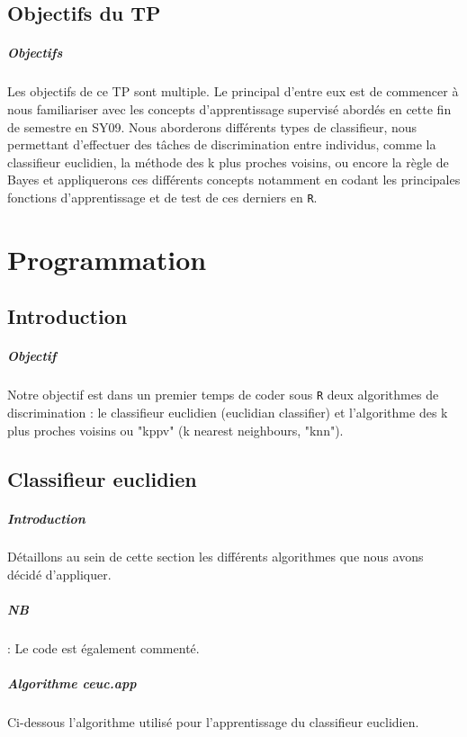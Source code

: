 \documentclass{report}
\begin{document}
\section{Objectifs du TP}
\paragraph{Objectifs}
Les objectifs de ce TP sont multiple. Le principal d'entre eux est de commencer à nous familiariser avec les concepts d'apprentissage supervisé abordés en cette fin de semestre en SY09. Nous aborderons différents types de classifieur, nous permettant d'effectuer des tâches de discrimination entre individus, comme la classifieur euclidien, la méthode des k plus proches voisins, ou encore la règle de Bayes et appliquerons ces différents concepts notamment en codant les principales fonctions d'apprentissage et de test de ces derniers en \verb+R+.

\chapter{Programmation}
\section{Introduction}
\paragraph{Objectif}
Notre objectif est dans un premier temps de coder sous \verb+R+ deux algorithmes de discrimination : le classifieur euclidien (euclidian classifier) et l'algorithme des k plus proches voisins ou "kppv" (k nearest neighbours, "knn").

\section{Classifieur euclidien}
\paragraph{Introduction}
Détaillons au sein de cette section les différents algorithmes que nous avons décidé d'appliquer.
\paragraph{NB} : Le code est également commenté.

\newpage
\paragraph{Algorithme ceuc.app}
Ci-dessous l'algorithme utilisé pour l'apprentissage du classifieur euclidien.
\end{document}
